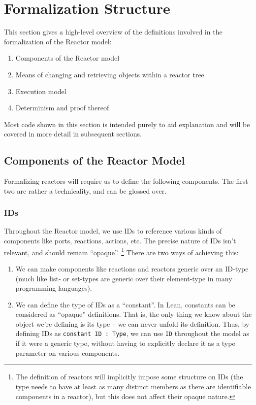 \section{Formalization Structure}

This section gives a high-level overview of the definitions involved in the formalization of the Reactor model:

\begin{enumerate}
    \item Components of the Reactor model
    \item Means of changing and retrieving objects within a reactor tree
    \item Execution model
    \item Determinism and proof thereof
\end{enumerate}

Most code shown in this section is intended purely to aid explanation and will be covered in more detail in subsequent sections.

\subsection{Components of the Reactor Model}

Formalizing reactors will require us to define the following components.
The first two are rather a technicality, and can be glossed over.

\subsubsection{IDs}

Throughout the Reactor model, we use IDs to reference various kinds of components like ports, reactions, actions, etc.
The precise nature of IDs isn't relevant, and should remain ``opaque''. \footnote{The definition of reactors will implicitly impose some structure on IDs (the type needs to have at least as many distinct members as there are identifiable components in a reactor), but this does not affect their opaque nature.}
There are two ways of achieving this:

\begin{enumerate}
    \item We can make components like reactions and reactors generic over an ID-type (much like list- or set-types are generic over their element-type in many programming languages).
    \item We can define the type of IDs as a ``constant''.
        In Lean, constants can be considered as ``opaque'' definitions. 
        That is, the only thing we know about the object we're defining is its type -- we can never unfold its definition.
        Thus, by defining IDs as \lstinline{constant ID : Type}, we can use \lstinline{ID} throughout the model as if it were a generic type, without having to explicitly declare it as a type parameter on various components.
\end{enumerate}

